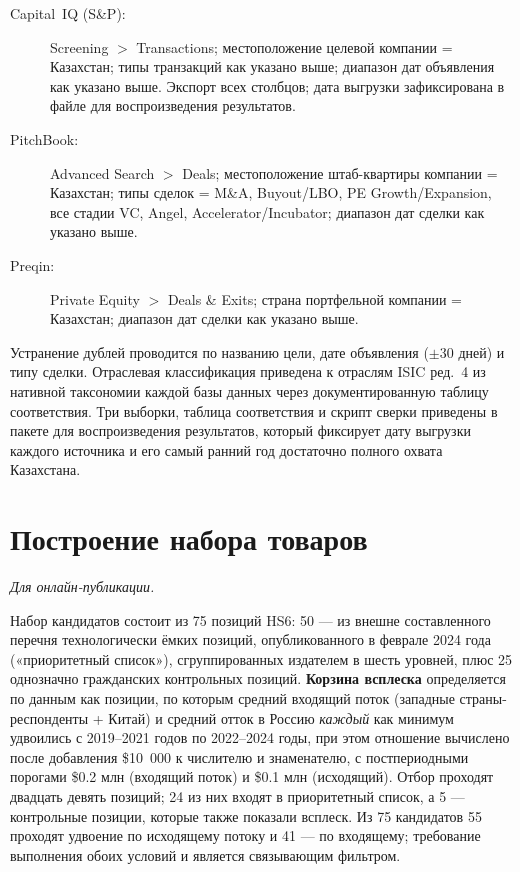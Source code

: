 \documentclass[12pt]{article}
\begin{document}
\begin{description}
\item[Capital~IQ (S\&P):] Screening $>$ Transactions; местоположение целевой компании =
Казахстан; типы транзакций как указано выше; диапазон дат объявления как указано выше.
Экспорт всех столбцов; дата выгрузки зафиксирована в файле для воспроизведения результатов.
\item[PitchBook:] Advanced Search $>$ Deals; местоположение штаб-квартиры компании =
Казахстан; типы сделок = M\&A, Buyout\slash LBO, PE Growth\slash Expansion, все стадии VC,
Angel, Accelerator\slash Incubator; диапазон дат сделки как указано выше.
\item[Preqin:] Private Equity $>$ Deals \& Exits; страна портфельной компании = Казахстан;
диапазон дат сделки как указано выше.
\end{description}

Устранение дублей проводится по названию цели, дате объявления ($\pm$30 дней) и типу
сделки. Отраслевая классификация приведена к отраслям ISIC ред.~4 из нативной таксономии
каждой базы данных через документированную таблицу соответствия. Три выборки, таблица
соответствия и скрипт сверки приведены в пакете для воспроизведения результатов, который
фиксирует дату выгрузки каждого источника и его самый ранний год достаточно полного охвата
Казахстана.

\section{Построение набора товаров}\label{app:products}
\emph{Для онлайн-публикации.}

\medskip
Набор кандидатов состоит из 75 позиций HS6: 50 — из внешне составленного перечня
технологически ёмких позиций, опубликованного в феврале 2024 года («приоритетный список»),
сгруппированных издателем в шесть уровней, плюс 25 однозначно гражданских контрольных
позиций. \textbf{Корзина всплеска} определяется по данным как позиции, по которым средний
входящий поток (западные страны-респонденты + Китай) и средний отток в Россию \emph{каждый}
как минимум удвоились с 2019--2021 годов по 2022--2024 годы, при этом отношение вычислено
после добавления \$10~000 к числителю и знаменателю, с постпериодными порогами \$0.2 млн
(входящий поток) и \$0.1 млн (исходящий). Отбор проходят двадцать девять позиций; 24 из них
входят в приоритетный список, а 5 — контрольные позиции, которые также показали всплеск. Из
75 кандидатов 55 проходят удвоение по исходящему потоку и 41 — по входящему; требование
выполнения обоих условий и является связывающим фильтром.
\end{document}
